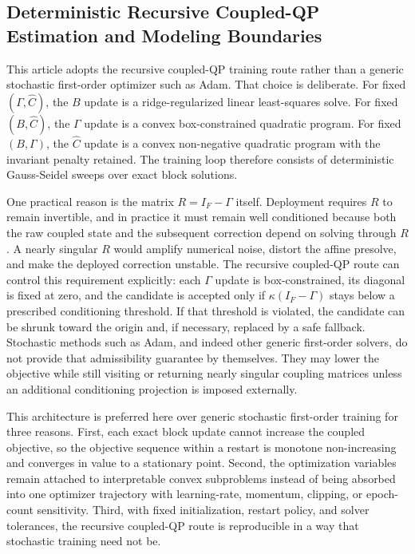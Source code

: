 \documentclass[11pt]{article}
\begin{document}
\subsection{Deterministic Recursive Coupled-QP Estimation and Modeling Boundaries}

This article adopts the recursive coupled-QP training route rather than a generic stochastic first-order optimizer such as Adam. That choice is deliberate. For fixed $(\Gamma, \widehat{C})$, the $B$ update is a ridge-regularized linear least-squares solve. For fixed $(B, \widehat{C})$, the $\Gamma$ update is a convex box-constrained quadratic program. For fixed $(B, \Gamma)$, the $\widehat{C}$ update is a convex non-negative quadratic program with the invariant penalty retained. The training loop therefore consists of deterministic Gauss-Seidel sweeps over exact block solutions.

One practical reason is the matrix $R = I_F - \Gamma$ itself. Deployment requires $R$ to remain invertible, and in practice it must remain well conditioned because both the raw coupled state and the subsequent correction depend on solving through $R$. A nearly singular $R$ would amplify numerical noise, distort the affine presolve, and make the deployed correction unstable. The recursive coupled-QP route can control this requirement explicitly: each $\Gamma$ update is box-constrained, its diagonal is fixed at zero, and the candidate is accepted only if $\kappa(I_F - \Gamma)$ stays below a prescribed conditioning threshold. If that threshold is violated, the candidate can be shrunk toward the origin and, if necessary, replaced by a safe fallback. Stochastic methods such as Adam, and indeed other generic first-order solvers, do not provide that admissibility guarantee by themselves. They may lower the objective while still visiting or returning nearly singular coupling matrices unless an additional conditioning projection is imposed externally.

This architecture is preferred here over generic stochastic first-order training for three reasons. First, each exact block update cannot increase the coupled objective, so the objective sequence within a restart is monotone non-increasing and converges in value to a stationary point. Second, the optimization variables remain attached to interpretable convex subproblems instead of being absorbed into one optimizer trajectory with learning-rate, momentum, clipping, or epoch-count sensitivity. Third, with fixed initialization, restart policy, and solver tolerances, the recursive coupled-QP route is reproducible in a way that stochastic training need not be.
\end{document}
